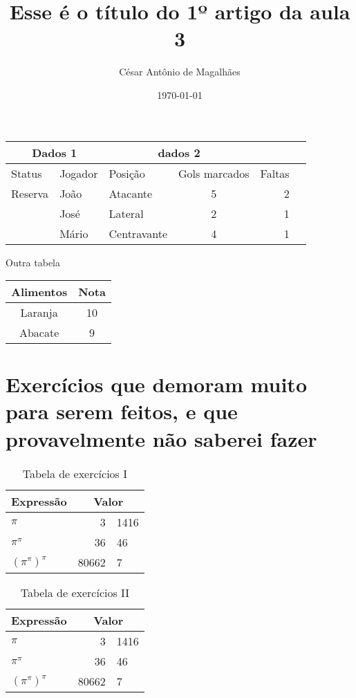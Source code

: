 \documentclass[12pt, a4paper]{article}
\title{Esse é o título do 1º artigo da aula 3}
\author{César Antônio de Magalhães}
\date{\today}
\begin{document}
		
	\begin{tabular}{|l|@{}l@{}|p{4cm}|c|r|l@{Teste}|}
		\hline
		\multicolumn{2}{|c|}{Dados 1} & \multicolumn{2}{c|}{dados 2} &  & \\ \hline
		Status  & Jogador             & Posição     & Gols marcados  & Faltas & \\ \hline
		Reserva & João                & Atacante    &       5        &      2 & \\ \cline{2-6}
		        & José                & Lateral     &       2        &      1 & \\ \cline{2-6}
		        & Mário               & Centravante &       4        &      1 & \\ \hline
	\end{tabular}
	
	Outra tabela
	
	\begin{tabular}{|c|c|}
		\hline 
		Alimentos & Nota \\ 
		\hline 
		Laranja & 10 \\ 
		\hline 
		Abacate  & 9 \\ 
		\hline 
	\end{tabular} 
	
	\tableofcontents
	
	\listoftables
	
	\section[Lista de exercícios]{Exercícios que demoram muito para serem feitos, e que provavelmente não saberei fazer}
	
	\begin{table}[htbp]
		\centering	
		\begin{tabular}{lr@{.}l}
			Expressão       & \multicolumn{2}{c}{Valor} \\ \hline
			$\pi$           &     3 & 1416              \\
			$\pi^\pi$       &    36 & 46                \\
			$(\pi^\pi)^\pi$ & 80662 & 7                 \\ \hline
		\end{tabular}
		
		\caption{Tabela de exercícios I}
	\end{table}
	
	\lipsum[1]
	
	\begin{table}[htbp]
		\centering	
		\begin{tabular}{lr@{.}l}
			Expressão       & \multicolumn{2}{c}{Valor} \\ \hline
			$\pi$           &     3 & 1416              \\
			$\pi^\pi$       &    36 & 46                \\
			$(\pi^\pi)^\pi$ & 80662 & 7                 \\ \hline
		\end{tabular}
		
		\caption{Tabela de exercícios II}
	\end{table}
	
\end{document}
